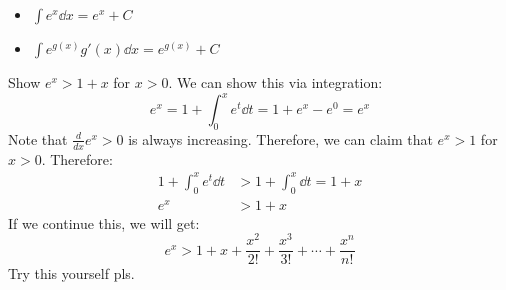 \begin{itemize}
\begin{itemize}
        \item $\int e^x \dd{x} = e^x + C$
        \item $\int e^{g(x)}g'(x) \dd{x} = e^{g(x)}+C$
    \end{itemize}
    \begin{example}
        Show $e^x>1+x$ for $x>0$. We can show this via integration:
        \begin{equation}
            e^x = 1+ \int_0^x e^{t} \dd{t} = 1+e^x-e^0 = e^x
            \label{eq:}
        \end{equation}
        Note that $\frac{d}{dx}e^x > 0$ is always increasing. Therefore, we can claim that $e^x > 1$ for $x>0$. Therefore:
        \begin{align}
            1 + \int_0^x e^t \dd{t} &> 1 + \int_0^x \dd{t} = 1+x \\ 
            e^x &> 1 + x
        \end{align}
        If we continue this, we will get:
        \begin{equation}
            e^x > 1+x+\frac{x^2}{2!}+\frac{x^3}{3!}+\cdots+\frac{x^n}{n!}
            \label{eq:}
        \end{equation}
        Try this yourself pls.
    \end{example}
\end{itemize}